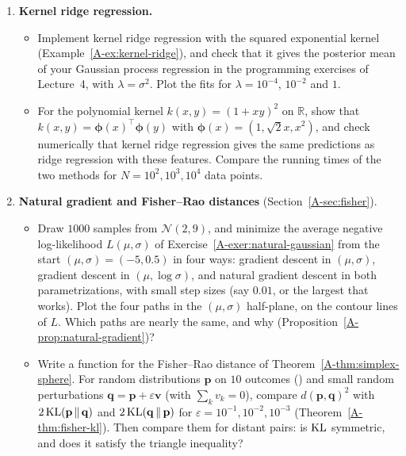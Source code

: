 \begin{enumerate}[label=\textbf{P\arabic*.}, leftmargin=*]
    \item \textbf{Kernel ridge regression.}
    \begin{itemize}
        \item Implement kernel ridge regression with the squared exponential kernel (Example~\ref{A-ex:kernel-ridge}), and check that it gives the posterior mean of your Gaussian process regression in the programming exercises of Lecture~4, with $\lambda = \sigma^2$. Plot the fits for $\lambda = 10^{-4}$, $10^{-2}$ and $1$.
        \item For the polynomial kernel $k(x, y) = (1 + xy)^2$ on $\mathbb{R}$, show that $k(x, y) = \boldsymbol{\phi}(x)^\top\boldsymbol{\phi}(y)$ with $\boldsymbol{\phi}(x) = (1, \sqrt{2}x, x^2)$, and check numerically that kernel ridge regression gives the same predictions as ridge regression with these features. Compare the running times of the two methods for $N = 10^2, 10^3, 10^4$ data points.
    \end{itemize}

    \item \textbf{Natural gradient and Fisher--Rao distances} (Section~\ref{A-sec:fisher}).
    \begin{itemize}
        \item Draw $1000$ samples from $\mathcal{N}(2, 9)$, and minimize the average negative log-likelihood $L(\mu, \sigma)$ of Exercise~\ref{A-exer:natural-gaussian} from the start $(\mu, \sigma) = (-5, 0.5)$ in four ways: gradient descent in $(\mu, \sigma)$, gradient descent in $(\mu, \log\sigma)$, and natural gradient descent in both parametrizations, with small step sizes (say $0.01$, or the largest that works). Plot the four paths in the $(\mu, \sigma)$ half-plane, on the contour lines of $L$. Which paths are nearly the same, and why (Proposition~\ref{A-prop:natural-gradient})?
        \item Write a function for the Fisher--Rao distance of Theorem~\ref{A-thm:simplex-sphere}. For random distributions $\mathbf{p}$ on $10$ outcomes () and small random perturbations $\mathbf{q} = \mathbf{p} + \varepsilon\mathbf{v}$ (with $\sum_k v_k = 0$), compare $d(\mathbf{p}, \mathbf{q})^2$ with $2\operatorname{KL}(\mathbf{p} \,\|\, \mathbf{q})$ and $2\operatorname{KL}(\mathbf{q} \,\|\, \mathbf{p})$ for $\varepsilon = 10^{-1}, 10^{-2}, 10^{-3}$ (Theorem~\ref{A-thm:fisher-kl}). Then compare them for distant pairs: is $\operatorname{KL}$ symmetric, and does it satisfy the triangle inequality?
    \end{itemize}
\end{enumerate}
\endgroup
